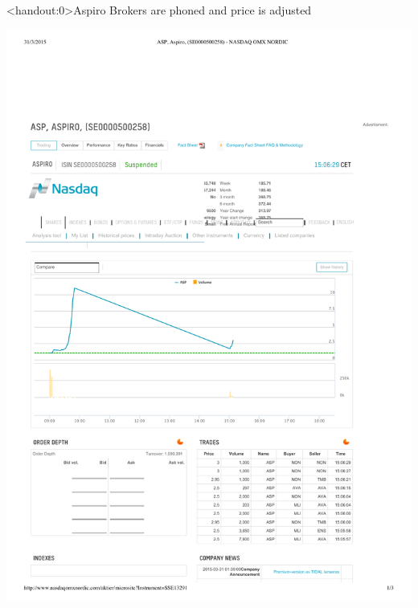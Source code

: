 \documentclass[english,10pt
,aspectratio=169
]{beamer}
\begin{document}
\begin{frame}<handout:0>{Aspiro}
	Brokers are phoned and price is adjusted
	
	\includegraphics{pics/aspiro2}
\end{frame}
\end{document}
